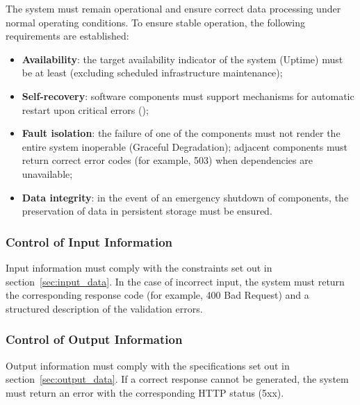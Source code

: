 \documentclass[12pt,a4paper]{extarticle}
\begin{document}
\begin{hseExample}
The system must remain operational and ensure correct data processing under normal operating conditions. To ensure stable operation, the following requirements are established:
\begin{itemize}[nosep, leftmargin=1.25cm]
    \item \textbf{Availability}: the target availability indicator of the system (Uptime) must be at least  (excluding scheduled infrastructure maintenance);
    \item \textbf{Self-recovery}: software components must support mechanisms for automatic restart upon critical errors ();
    \item \textbf{Fault isolation}: the failure of one of the components must not render the entire system inoperable (Graceful Degradation); adjacent components must return correct error codes (for example, 503) when dependencies are unavailable;
    \item \textbf{Data integrity}: in the event of an emergency shutdown of components, the preservation of data in persistent storage must be ensured.
\end{itemize}
\end{hseExample}

\subsubsection{Control of Input Information}

\begin{hseExample}
Input information must comply with the constraints set out in section~\ref{sec:input_data}. In the case of incorrect input, the system must return the corresponding response code (for example, 400 Bad Request) and a structured description of the validation errors.
\end{hseExample}

\subsubsection{Control of Output Information}

\begin{hseExample}
Output information must comply with the specifications set out in section~\ref{sec:output_data}. If a correct response cannot be generated, the system must return an error with the corresponding HTTP status (5xx).
\end{hseExample}
\end{document}
